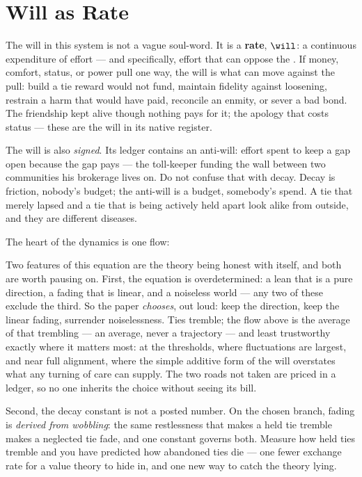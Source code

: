 \documentclass[../main_explainer]{subfiles}
\begin{document}
\section{Will as Rate}
\label{sec:explainer:will}

The will in this system is not a vague soul-word. It is a \textbf{rate}, $\will$: a
continuous expenditure of effort --- and specifically, effort that can oppose the
. If money, comfort, status, or power pull one way, the will is what
can move against the pull: build a tie reward would not fund, maintain fidelity against
loosening, restrain a harm that would have paid, reconcile an enmity, or sever a bad
bond. The friendship kept alive though nothing pays for it; the apology that costs
status --- these are the will in its native register.

The will is also \emph{signed}. Its ledger contains an anti-will: effort spent to keep a
gap open because the gap pays --- the toll-keeper funding the wall between two
communities his brokerage lives on. Do not confuse that with decay. Decay is friction,
nobody's budget; the anti-will is a budget, somebody's spend. A tie that merely lapsed
and a tie that is being actively held apart look alike from outside, and they are
different diseases.

The heart of the dynamics is one flow:


Two features of this equation are the theory being honest with itself, and both are
worth pausing on. First, the equation is overdetermined: a lean that is a pure
direction, a fading that is linear, and a noiseless world --- any two of these exclude
the third. So the paper \emph{chooses}, out loud: keep the direction, keep the linear
fading, surrender noiselessness. Ties tremble; the flow above is the average of that
trembling --- an average, never a trajectory --- and least
trustworthy exactly where it matters most: at the thresholds, where fluctuations are
largest, and near full alignment, where the simple additive form of the will overstates
what any turning of care can supply. The two roads
not taken are priced in a ledger, so no one inherits the choice without seeing its bill.

Second, the decay constant is not a posted number. On the chosen branch, fading is
\emph{derived from wobbling}: the same restlessness that makes a held tie tremble makes
a neglected tie fade, and one constant governs both. Measure how held ties tremble and
you have predicted how abandoned ties die --- one fewer exchange rate for a value theory
to hide in, and one new way to catch the theory lying.
\end{document}
